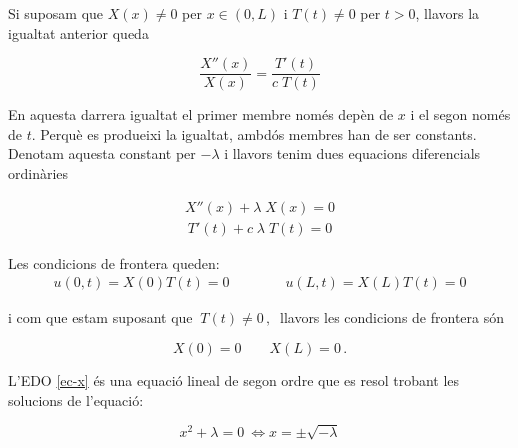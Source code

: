 \documentclass[12pt]{article}
\begin{document}
Si suposam que $X(x)\neq 0 $ per $x\in(0,L)$ i $T(t)\neq 0$ per $t> 0$, llavors la igualtat anterior queda

\[
 \frac{X''(x)}{X(x)}=\frac{T'(t)}{c\;T(t)}
\]

En aquesta darrera igualtat el primer membre nom{\'e}s dep{\`e}n de $x$ i el segon nom{\'e}s de $t.$ Perqu{\`e} es produeixi la
igualtat, ambd{\'o}s membres han de ser constants. Denotam aquesta constant per $-\lambda$ i llavors tenim dues equacions diferencials ordin{\`a}ries

\begin{eqnarray}
 X''(x)+\lambda\; X(x)=0\label{ec-x}
\end{eqnarray}
\begin{eqnarray}
T'(t)+c\;\lambda\; T(t)=0\label{ec-t}
\end{eqnarray}

Les condicions de frontera queden:
\begin{eqnarray*}
 u(0,t)=X(0)T(t)=0\qquad\qquad u(L,t)=X(L)T(t)=0
\end{eqnarray*}

i com que estam suposant que $\ T(t)\neq 0\,,\ $ llavors les condicions de frontera s{\'o}n

\[
 X(0)=0\qquad X(L)=0\,.
\]

L'EDO \eqref{ec-x} {\'e}s una equaci{\'o} lineal de segon ordre que es resol trobant les solucions de l'equaci{\'o}:

$$
x^2+\lambda=0\ \Longleftrightarrow x=\pm\sqrt{-\lambda}
$$
\end{document}

